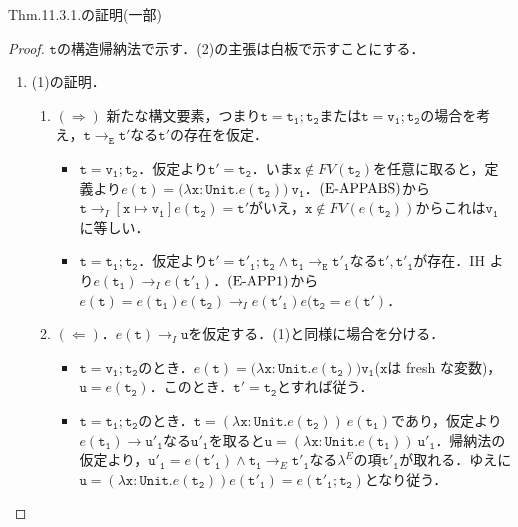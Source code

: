 \documentclass[9pt]{beamer}
\begin{document}
\begin{frame}{Thm.11.3.1.の証明(一部)}
    \begin{proof}
       $\mathtt{t}$の構造帰納法で示す．(2)の主張は白板で示すことにする．
        \begin{enumerate}
        \item (1)の証明．\begin{enumerate}
        \item $(\Rightarrow)$ 新たな構文要素，つまり$\mathtt{t = t_{1};t_{2}}$または$\mathtt{t = v_{1};t_{2}}$の場合を考え，$\mathtt{t\rightarrow_{E} t'}$なる$\mathtt{t'}$の存在を仮定．\begin{itemize}
        \item $\mathtt{t = v_{1};t_{2}}$．仮定より$\mathtt{t' = t_{2}}$．いま$\mathtt{x}\notin FV(\mathtt{t_{2}})$を任意に取ると，定義より$e(\mathtt{t}) = \mathtt{(\lambda x: Unit. }e\mathtt{(t_{2}))\ v_{1}}$．$\text{\rm(E-APPABS)}$から$\mathtt{t}\rightarrow_{I}\left[\mathtt{x\mapsto v_{1}}\right]e\mathtt{(t_{2})} = \mathtt{t'}$がいえ，$\mathtt{x\notin}FV(e(\mathtt{t_{2}}))$からこれは$\mathtt{v_{1}}$に等しい．
        \item $\mathtt{t = t_{1};t_{2}}$．仮定より$\mathtt{t' = t'_{1};t_{2}}\land \mathtt{t_{1}\rightarrow_{E}t'_{1}}$なる$\mathtt{t', t'_{1}}$が存在．IH より$e(\mathtt{t_{1}}) \rightarrow_{I} e(\mathtt{t'_{1}})$．$\text{\rm{(E-APP1)}}$から$e(\mathtt{t}) = e(\mathtt{t_{1}})e(\mathtt{t_{2}})\rightarrow_{I} e(\mathtt{t'_{1}})e(\mathtt{t_{2}} = e(\mathtt{t'})$．
        \end{itemize}
        \item $(\Leftarrow)$．$e(\mathtt{t})\rightarrow_{I}\mathtt{u}$を仮定する．(1)と同様に場合を分ける．\begin{itemize}
        \item $\mathtt{t = v_{1};t_{2}}$のとき．$e(\mathtt{t}) = \mathtt{(\lambda x:Unit. }e\mathtt{(t_{2}))v_{1}}$($\mathtt{x}$は fresh な変数)，$\mathtt{u} = e(\mathtt{t_{2}})$．このとき．$\mathtt{t' = t_{2}}$とすれば従う．
        \item $\mathtt{t = t_{1};t_{2}}$のとき．$\mathtt{t} = (\mathtt{\lambda x:Unit.}e (\mathtt{t_{2}}))\ e(\mathtt{t_{1}})$であり，仮定より$e(\mathtt{t_{1}})\rightarrow \mathtt{u'_{1}}$なる$\mathtt{u'_{1}}$を取ると$\mathtt{u} = (\mathtt{\lambda x:Unit.}e(\mathtt{t_{1}}))\ \mathtt{u'_{1}}$．帰納法の仮定より，$\mathtt{u'_{1}} = e(\mathtt{t'_{1}})\land \mathtt{t_{1}}\rightarrow_{E} \mathtt{t'_{1}}$なる$\lambda^{E}$の項$\mathtt{t'_{1}}$が取れる．ゆえに$\mathtt{u} = (\mathtt{\lambda x: Unit.}e(\mathtt{t_{2}}))e(\mathtt{t'_{1}}) = e(\mathtt{t'_{1};t_{2}})$となり従う．
        \end{itemize}
        \end{enumerate}
        \end{enumerate}
    \end{proof}
\end{frame}
\end{document}
